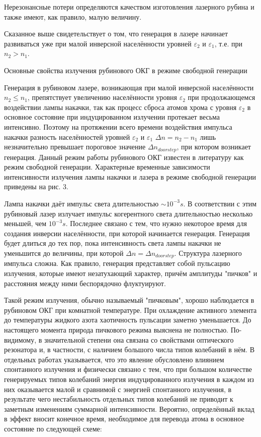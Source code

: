 \documentclass[a4paper,14pt,russian]{article}
\begin{document}
Нерезонансные потери определяются качеством изготовления лазерного рубина и также имеют, как правило, малую величину.

Сказанное выше свидетельствует о том, что генерация в лазере начинает развиваться уже при малой инверсной населённости уровней $\varepsilon_2$ и $\varepsilon_1$, т.е. при $n_2 > n_1$.

Основные свойства излучения рубинового ОКГ в режиме свободной генерации

Генерация в рубиновом лазере, возникающая при малой инверсной населённости $n_2 \leqslant n_1$, препятствует увеличению населённости уровня $\varepsilon_2$ при продолжающемся воздействии лампы накачки, так как процесс сброса атомов хрома с уровня $\varepsilon_2$ в основное состояние при индуцированном излучении протекает весьма интенсивно. Поэтому на протяжении всего времени воздействия импульса накачки разность населённостей уровней $\varepsilon_2$ и $\varepsilon_1$ $\Delta n = n_2 - n_1$ лишь незначительно превышает пороговое значение $\Delta n_{doorstep}$, при котором возникает генерация. Данный режим работы рубинового ОКГ известен в литературу как режим свободной генерации. Характерные временные зависимости интенсивности излучения лампы накачки и лазера в режиме свободной генерации приведены на рис. 3.

Лампа накачки даёт импульс света длительностью $\sim 10^{-3} s$. В соответствии с этим рубиновый лазер излучает импульс когерентного света длительностью несколько меньшей, чем $10^{-3} s$. Последнее связано с тем, что нужно некоторое время для создания инверсии населённости, при которой начинается генерация. Генерация будет длиться до тех пор, пока интенсивность света лампы накачки не уменьшится до величины, при которой $\Delta n = \Delta n_{doorstep}$. Структура лазерного импульса сложна. Как правило, генерация представляет собой пульсацию излучения, которые имеют незатухающий характер, причём амплитуды "пичков" и расстояния между ними беспорядочно флуктуируют.

Такой режим излучения, обычно называемый "пичковым", хорошо наблюдается в рубиновом ОКГ при комнатной температуре. При охлаждение активного элемента до температуры жидкого азота хаотичность пульсации заметно уменьшается. До настоящего момента природа пичкового режима выяснена не полностью. По-видимому, в значительной степени она связана со свойствами оптического резонатора и, в частности, с наличием большого числа типов колебаний в нём. В отдельных работах указывается, что это явление обусловлено влиянием спонтанного излучения и физически связано с тем, что при большом количестве генерируемых типов колебаний энергия индуцированного излучения в каждом из них оказывается малой и сравнимой с энергией спонтанного излучения, в результате чего нестабильность отдельных типов колебаний не приводит к заметным изменениям суммарной интенсивности. Вероятно, определённый вклад в эффект вносит конечное время, необходимое для перевода атома в основное состояние по следующей схеме:
\end{document}
